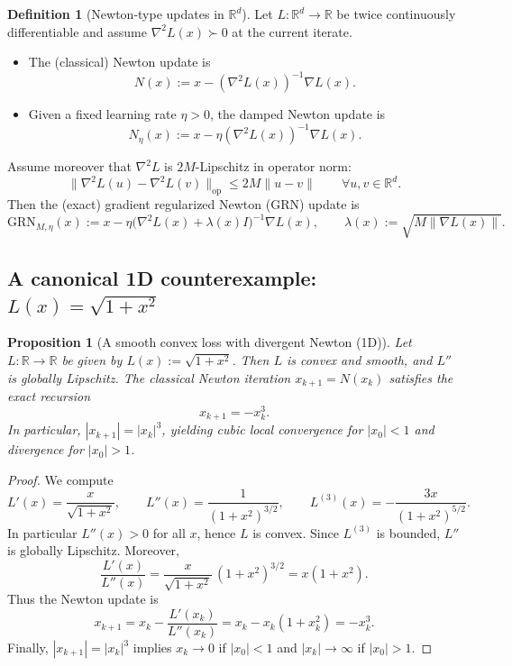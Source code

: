 \documentclass{article}
\theoremstyle{plain}
\newtheorem{proposition}[theorem]{Proposition}
\theoremstyle{definition}
\newtheorem{definition}[theorem]{Definition}
\theoremstyle{remark}
\begin{document}
\begin{definition}[Newton-type updates in $\mathbb{R}^d$]
\label{def:newton_updates}
Let $L:\mathbb{R}^d\to\mathbb{R}$ be twice continuously differentiable and assume
$\nabla^2 L(x)\succ 0$ at the current iterate.
\begin{itemize}
  \item The (classical) Newton update is
  \[
    N(x) := x - (\nabla^2 L(x))^{-1}\nabla L(x).
  \]
  \item Given a fixed learning rate $\eta>0$, the damped Newton update is
  \[
    N_\eta(x) := x - \eta(\nabla^2 L(x))^{-1}\nabla L(x).
  \]
\end{itemize}
Assume moreover that $\nabla^2 L$ is $2M$-Lipschitz in operator norm:
\[
  \|\nabla^2 L(u)-\nabla^2 L(v)\|_{\mathrm{op}}\le 2M\|u-v\|
  \qquad \forall u,v\in\mathbb{R}^d.
\]
Then the (exact) gradient regularized Newton (GRN) update is
\[
  \mathrm{GRN}_{M,\eta}(x) := x - \eta\big(\nabla^2L(x)+\lambda(x)I\big)^{-1}\nabla L(x),
  \qquad \lambda(x) := \sqrt{M\|\nabla L(x)\|}.
\]
\end{definition}

\subsection{A canonical 1D counterexample: $L(x)=\sqrt{1+x^2}$}

\begin{proposition}[A smooth convex loss with divergent Newton (1D)]
\label{prop:sqrt_divergence}
Let $L:\mathbb{R}\to\mathbb{R}$ be given by $L(x):=\sqrt{1+x^2}$.
Then $L$ is convex and smooth, and $L''$ is globally Lipschitz.
The classical Newton iteration $x_{k+1}=N(x_k)$ satisfies the exact recursion
\[
  x_{k+1} = -x_k^3.
\]
In particular, $|x_{k+1}|=|x_k|^3$, yielding cubic local convergence for $|x_0|<1$
and divergence for $|x_0|>1$.
\end{proposition}

\begin{proof}
We compute
\[
L'(x)=\frac{x}{\sqrt{1+x^2}},\qquad
L''(x)=\frac{1}{(1+x^2)^{3/2}},\qquad
L^{(3)}(x)=-\frac{3x}{(1+x^2)^{5/2}}.
\]
In particular $L''(x)>0$ for all $x$, hence $L$ is convex. Since $L^{(3)}$ is bounded,
$L''$ is globally Lipschitz. Moreover,
\[
\frac{L'(x)}{L''(x)}
=\frac{x}{\sqrt{1+x^2}}\,(1+x^2)^{3/2}
=x(1+x^2).
\]
Thus the Newton update is
\[
x_{k+1}=x_k-\frac{L'(x_k)}{L''(x_k)}
=x_k-x_k(1+x_k^2)
=-x_k^3.
\]
Finally, $|x_{k+1}|=|x_k|^3$ implies $x_k\to 0$ if $|x_0|<1$ and $|x_k|\to\infty$
if $|x_0|>1$.
\end{proof}
\end{document}

